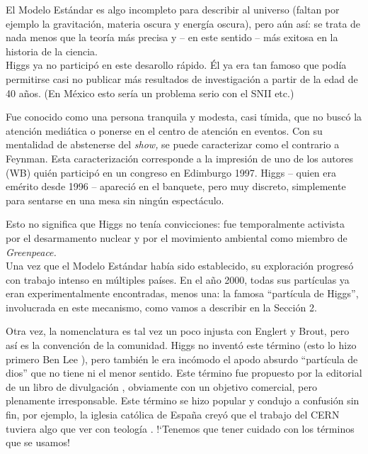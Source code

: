 El Modelo Est\'andar es algo incompleto para describir al
universo (faltan por ejemplo la gravitaci\'on, materia oscura y
energ\'ia oscura), pero a\'un as\'i: se trata de nada menos que la
teor\'ia m\'as precisa y -- en este sentido -- m\'as exitosa en
la historia de la ciencia.\\
 
Higgs ya no particip\'o en este desarollo r\'apido. \'El ya era
tan famoso que pod\'ia permitirse casi no publicar m\'as resultados
de investigaci\'on a partir de la edad de 40 a\~{n}os.
(En M\'exico esto ser\'ia un problema serio con el SNII etc.)
 
Fue conocido como una persona tranquila y modesta, casi t\'imida,
que no busc\'o la atenci\'on medi\'atica o ponerse en el centro de
atenci\'on en eventos. Con su mentalidad de abstenerse del
{\it show,} se puede caracterizar como el contrario a Feynman.
Esta caracterizaci\'on corresponde a la impresi\'on de uno de los
autores (WB) qui\'en particip\'o en un congreso en Edimburgo 1997.
Higgs -- quien era em\'erito desde 1996 -- apareci\'o en el banquete,
pero muy discreto, simplemente para sentarse en una mesa sin
ning\'un espect\'aculo.

Esto no significa que Higgs no ten\'ia convicciones: fue
temporalmente activista por el desarmamento nuclear y
por el movimiento ambiental como miembro de {\it Greenpeace.}\\

Una vez que el Modelo Est\'andar hab\'ia sido establecido, su exploraci\'on
progres\'o con trabajo intenso en m\'ultiples pa\'ises.
En el a\~no 2000, todas sus part\'iculas ya eran experimentalmente
encontradas, menos una: la famosa ``part\'icula de Higgs'', involucrada
en este mecanismo, como vamos a describir en la Secci\'on 2.

Otra vez, la nomenclatura es tal vez un poco injusta con Englert y
Brout, pero as\'i es la convenci\'on de la comunidad.
Higgs no invent\'o este t\'ermino (esto lo hizo primero  Ben Lee
\cite{boson}), pero tambi\'en le era inc\'omodo el
apodo absurdo ``part\'icula de dios'' que no tiene ni el menor sentido.
Este t\'ermino fue propuesto por la editorial de un libro de divulgaci\'on
\cite{Lederman},
obviamente con un objetivo comercial, pero plenamente irresponsable.
Este t\'ermino se hizo popular y condujo a confusi\'on sin fin,
por ejemplo, la iglesia cat\'olica de Espa\~na crey\'o que el trabajo del
CERN tuviera algo que ver con teolog\'ia \cite{Guardian}. !`Tenemos que
tener cuidado con los t\'erminos que se usamos!

